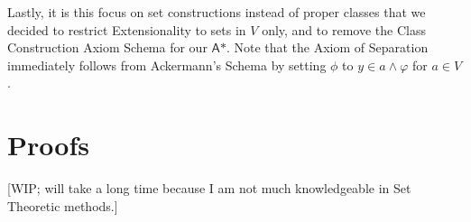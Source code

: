 \documentclass{article}
\begin{document}
Lastly, it is this focus on set constructions instead of proper classes that we decided to restrict Extensionality to sets in $V$ only, and to remove the Class Construction Axiom Schema for our $\textsf{A*}$. Note that the Axiom of Separation immediately follows from Ackermann's Schema by setting $\phi$ to $y \in a \wedge \varphi$ for $a\in V$.




\appendix

\section{Proofs}\label{proofs}
[WIP; will take a long time because I am not much knowledgeable in Set Theoretic methods.]
\end{document}
